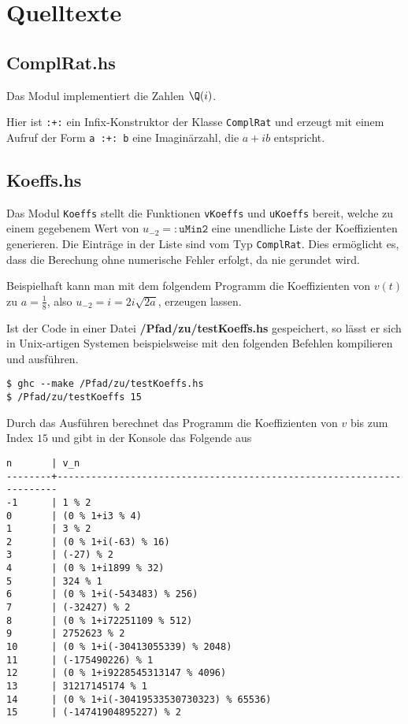 \chapter{Quelltexte}

\section{ComplRat.hs}
Das Modul  implementiert die Zahlen $\Q(i)$.

Hier ist \texttt{:+:} ein Infix-Konstruktor der Klasse \texttt{ComplRat} und
erzeugt mit einem Aufruf der Form \texttt{a :+: b} eine Imaginärzahl, die
$a+ib$ entspricht.

\section{Koeffs.hs} \label{sec:Koeffs.hs}
Das Modul \texttt{Koeffs} stellt die Funktionen \texttt{vKoeffs} und
\texttt{uKoeffs} bereit, welche zu einem gegebenem Wert von
$u_{-2}=:\texttt{uMin2}$ eine
unendliche Liste der Koeffizienten generieren. Die Einträge in der Liste sind
vom Typ \texttt{ComplRat}.
Dies ermöglicht es, dass die Berechung ohne numerische Fehler erfolgt, da nie
gerundet wird.

Beispielhaft kann man mit dem folgendem Programm die Koeffizienten von $v(t)$
zu $a=\frac{1}{8}$, also $u_{-2}=i=2i\sqrt{2a}$, erzeugen lassen.

Ist der Code in einer Datei \textbf{/Pfad/zu/testKoeffs.hs} gespeichert, so
lässt er sich in Unix-artigen Systemen beispielsweise mit den folgenden
Befehlen kompilieren und ausführen.
\begin{lstlisting}[style=Bash]
$ ghc --make /Pfad/zu/testKoeffs.hs
$ /Pfad/zu/testKoeffs 15
\end{lstlisting}
Durch das Ausführen berechnet das Programm die Koeffizienten von $v$ bis zum
Index $15$ und gibt in der Konsole das Folgende aus
\begin{lstlisting}[style=Bash]
n       | v_n
--------+----------------------------------------------------------------------
-1      | 1 % 2
0       | (0 % 1+i3 % 4)
1       | 3 % 2
2       | (0 % 1+i(-63) % 16)
3       | (-27) % 2
4       | (0 % 1+i1899 % 32)
5       | 324 % 1
6       | (0 % 1+i(-543483) % 256)
7       | (-32427) % 2
8       | (0 % 1+i72251109 % 512)
9       | 2752623 % 2
10      | (0 % 1+i(-30413055339) % 2048)
11      | (-175490226) % 1
12      | (0 % 1+i9228545313147 % 4096)
13      | 31217145174 % 1
14      | (0 % 1+i(-30419533530730323) % 65536)
15      | (-14741904895227) % 2
\end{lstlisting}
